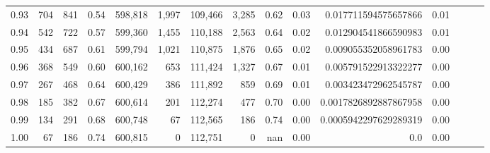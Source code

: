 \begin{tabular}{rrrrrrrrrrrrrrr}
0.93 &     704 &    841 &  0.54 &  598,818 &    1,997 &  109,466 &    3,285 &  0.62 &  0.03 &   0.017711594575657866 &      0.01 \\
0.94 &     542 &    722 &  0.57 &  599,360 &    1,455 &  110,188 &    2,563 &  0.64 &  0.02 &   0.012904541866590983 &      0.01 \\
0.95 &     434 &    687 &  0.61 &  599,794 &    1,021 &  110,875 &    1,876 &  0.65 &  0.02 &   0.009055352058961783 &      0.00 \\
0.96 &     368 &    549 &  0.60 &  600,162 &      653 &  111,424 &    1,327 &  0.67 &  0.01 &   0.005791522913322277 &      0.00 \\
0.97 &     267 &    468 &  0.64 &  600,429 &      386 &  111,892 &      859 &  0.69 &  0.01 &   0.003423472962545787 &      0.00 \\
0.98 &     185 &    382 &  0.67 &  600,614 &      201 &  112,274 &      477 &  0.70 &  0.00 &  0.0017826892887867958 &      0.00 \\
0.99 &     134 &    291 &  0.68 &  600,748 &       67 &  112,565 &      186 &  0.74 &  0.00 &  0.0005942297629289319 &      0.00 \\
1.00 &      67 &    186 &  0.74 &  600,815 &        0 &  112,751 &        0 &   nan &  0.00 &                    0.0 &      0.00 \\
\bottomrule
\end{tabular}
